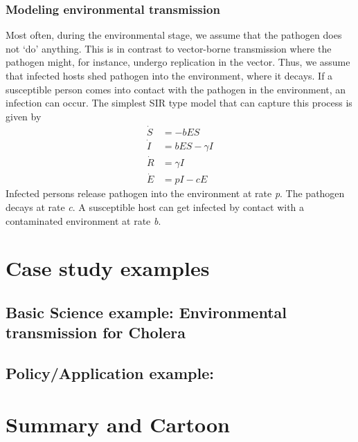 \documentclass[]{book}
\theoremstyle{definition}
\theoremstyle{definition}
\theoremstyle{definition}
\theoremstyle{remark}
\begin{document}
\hypertarget{myadvancedbox}{%
\subsubsection{Modeling environmental
transmission}\label{myadvancedbox}}

Most often, during the environmental stage, we assume that the pathogen
does not `do' anything. This is in contrast to vector-borne transmission
where the pathogen might, for instance, undergo replication in the
vector. Thus, we assume that infected hosts shed pathogen into the
environment, where it decays. If a susceptible person comes into contact
with the pathogen in the environment, an infection can occur. The
simplest SIR type model that can capture this process is given by \[ 
\begin{aligned}
\dot S &= - b E S \\
\dot I &= b E S  - \gamma I \\
\dot R &= \gamma I \\
\dot E &= p I - cE
\end{aligned}
\] Infected persons release pathogen into the environment at rate
\emph{p}. The pathogen decays at rate \emph{c}. A susceptible host can
get infected by contact with a contaminated environment at rate
\emph{b}.

\hypertarget{case-study-examples-1}{%
\section{Case study examples}\label{case-study-examples-1}}

\hypertarget{basic-science-example-environmental-transmission-for-cholera}{%
\subsection{Basic Science example: Environmental transmission for
Cholera}\label{basic-science-example-environmental-transmission-for-cholera}}

\hypertarget{policyapplication-example}{%
\subsection{Policy/Application
example:}\label{policyapplication-example}}

\hypertarget{summary-and-cartoon-2}{%
\section{Summary and Cartoon}\label{summary-and-cartoon-2}}
\end{document}
